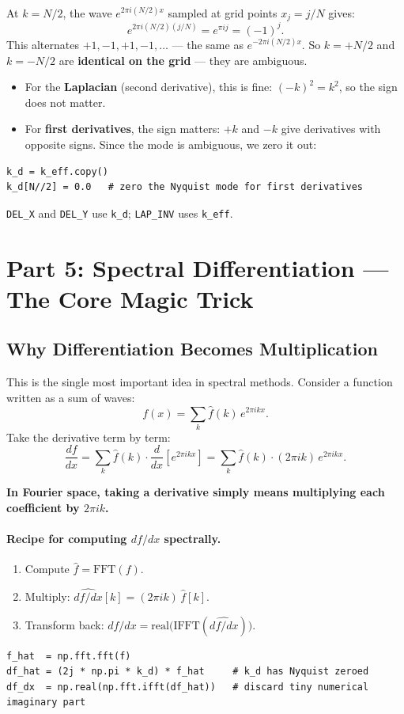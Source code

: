 \documentclass[12pt,a4paper]{article}
\newcommand{\code}[1]{\texttt{#1}}
\theoremstyle{definition}
\begin{document}
At $k = N/2$, the wave $e^{2\pi i(N/2)x}$ sampled at grid points
$x_j = j/N$ gives:
\[
  e^{2\pi i(N/2)(j/N)} = e^{\pi ij} = (-1)^j.
\]
This alternates $+1,-1,+1,-1,\ldots$ — the same as $e^{-2\pi i(N/2)x}$.
So $k = +N/2$ and $k = -N/2$ are \textbf{identical on the grid} — they are
ambiguous.

\begin{itemize}
  \item For the \textbf{Laplacian} (second derivative), this is fine:
    $(-k)^2 = k^2$, so the sign does not matter.
  \item For \textbf{first derivatives}, the sign matters: $+k$ and $-k$
    give derivatives with opposite signs.  Since the mode is ambiguous, we
    zero it out:
\end{itemize}
\begin{lstlisting}
k_d = k_eff.copy()
k_d[N//2] = 0.0   # zero the Nyquist mode for first derivatives
\end{lstlisting}
\code{DEL\_X} and \code{DEL\_Y} use \code{k\_d}; \code{LAP\_INV} uses
\code{k\_eff}.

\section{Part 5: Spectral Differentiation — The Core Magic Trick}

\subsection{Why Differentiation Becomes Multiplication}

This is the single most important idea in spectral methods.  Consider a
function written as a sum of waves:
\[
  f(x) = \sum_k \hat{f}(k)\,e^{2\pi ikx}.
\]
Take the derivative term by term:
\[
  \frac{df}{dx}
  = \sum_k \hat{f}(k)\cdot\frac{d}{dx}\!\left[e^{2\pi ikx}\right]
  = \sum_k \hat{f}(k)\cdot(2\pi ik)\,e^{2\pi ikx}.
\]

\begin{insightbox}
\textbf{In Fourier space, taking a derivative simply means multiplying each
coefficient by $2\pi ik$.}
\end{insightbox}

\paragraph{Recipe for computing $df/dx$ spectrally.}
\begin{enumerate}
  \item Compute $\hat{f} = \mathrm{FFT}(f)$.
  \item Multiply: $\widehat{df/dx}[k] = (2\pi ik)\,\hat{f}[k]$.
  \item Transform back: $df/dx = \mathrm{real}\bigl(\mathrm{IFFT}(\widehat{df/dx})\bigr)$.
\end{enumerate}
\begin{lstlisting}
f_hat  = np.fft.fft(f)
df_hat = (2j * np.pi * k_d) * f_hat     # k_d has Nyquist zeroed
df_dx  = np.real(np.fft.ifft(df_hat))   # discard tiny numerical imaginary part
\end{lstlisting}
\end{document}
